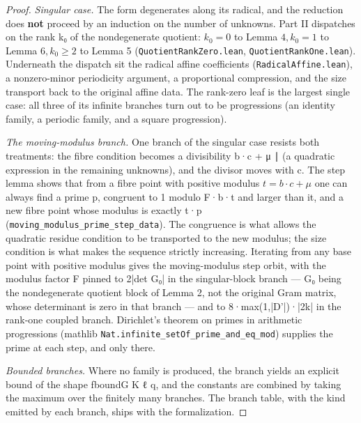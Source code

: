 \begin{proof}
\emph{Singular case.} The form degenerates along its radical, and the reduction does \textbf{not} proceed by an induction on the number of unknowns. Part II dispatches on the rank k₀ of the nondegenerate quotient: $k_{0} = 0$ to Lemma $4, k_{0} = 1$ to Lemma $6, k_{0} ≥ 2$ to Lemma 5 (\texttt{QuotientRankZero.\allowbreak{}lean}, \texttt{QuotientRankOne.\allowbreak{}lean}). Underneath the dispatch sit the radical affine coefficients (\texttt{RadicalAffine.\allowbreak{}lean}), a nonzero-minor periodicity argument, a proportional compression, and the size transport back to the original affine data. The rank-zero leaf is the largest single case: all three of its infinite branches turn out to be progressions (an identity family, a periodic family, and a square progression).

\emph{The moving-modulus branch.} One branch of the singular case resists both treatments: the fibre condition becomes a divisibility b·c + μ ∣ (a quadratic expression in the remaining unknowns), and the divisor moves with c. The step lemma shows that from a fibre point with positive modulus $t = b·c + μ$ one can always find a prime p, congruent to 1 modulo F·b·t and larger than it, and a new fibre point whose modulus is exactly t·p (\texttt{moving\_\allowbreak{}modulus\_\allowbreak{}prime\_\allowbreak{}step\_\allowbreak{}data}). The congruence is what allows the quadratic residue condition to be transported to the new modulus; the size condition is what makes the sequence strictly increasing. Iterating from any base point with positive modulus gives the moving-modulus step orbit, with the modulus factor F pinned to 2|det G₀| in the singular-block branch — G₀ being the nondegenerate quotient block of Lemma 2, not the original Gram matrix, whose determinant is zero in that branch — and to 8·max(1,|D'|)·|2k| in the rank-one coupled branch. Dirichlet's theorem on primes in arithmetic progressions (mathlib \texttt{Nat.\allowbreak{}infinite\_\allowbreak{}setOf\_\allowbreak{}prime\_\allowbreak{}and\_\allowbreak{}eq\_\allowbreak{}mod}) supplies the prime at each step, and only there.

\emph{Bounded branches.} Where no family is produced, the branch yields an explicit bound of the shape fboundG K ℓ q, and the constants are combined by taking the maximum over the finitely many branches. The branch table, with the kind emitted by each branch, ships with the formalization.

\end{proof}
